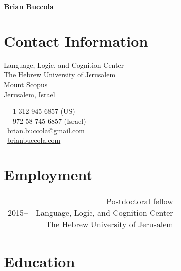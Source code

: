 \documentclass[11pt,letterpaper,twoside]{article}
\makeatletter
\newcommand{\bodywidth}{0.75}
\newenvironment{cvsection}{%
  \renewcommand{\arraystretch}{1.75}
  \begin{longtable}[l]{@{} L R @{}}
}{%
  \end{longtable}
}
\makeatother
\begin{document}
\thispagestyle{empty}

\begin{center}
  {\Huge\bfseries Brian Buccola}
\end{center}

\vspace{2em}

\section*{Contact Information}

\begin{minipage}[t]{0.63\textwidth}
  Language, Logic, and Cognition Center\\
  The Hebrew University of Jerusalem\\
  Mount Scopus\\
  Jerusalem, Israel
\end{minipage}
\begin{minipage}[t]{0.36\textwidth}
  \Telefon\ +1 312-945-6857 {\footnotesize (US)}\\
  \Telefon\ +972 58-745-6857 {\footnotesize (Israel)}\\
  \Letter\ \href{mailto:brian.buccola@gmail.com}{\ttfamily brian.buccola@gmail.com}\\
  \Keyboard\ \href{http://brianbuccola.com/}{\ttfamily brianbuccola.com}
\end{minipage}

\section*{Employment}

\begin{cvsection}
  2015-- & \parbox[t]{\bodywidth\textwidth}{%
    Postdoctoral fellow\\
    Language, Logic, and Cognition Center\\
    The Hebrew University of Jerusalem
  }\\
\end{cvsection}

\section*{Education}
\end{document}
